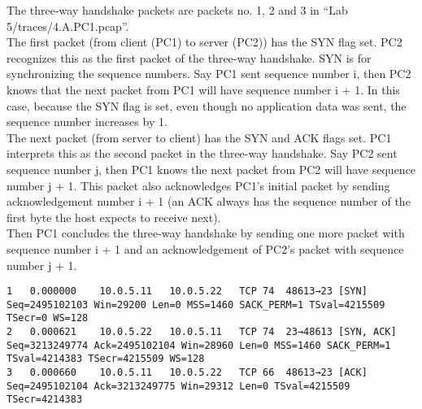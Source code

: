 The three-way handshake packets are packets no. 1, 2 and 3 in ``Lab 5/traces/4.A.PC1.pcap''. \\
The first packet (from client (PC1) to server (PC2)) has the SYN flag set. PC2 recognizes this as the first packet of the three-way handshake. SYN is for synchronizing the sequence numbers. Say PC1 sent sequence number i, then PC2 knows that the next packet from PC1 will have sequence number i + 1. In this case, because the SYN flag is set, even though no application data was sent, the sequence number increases by 1. \\
The next packet (from server to client) has the SYN and ACK flags set. PC1 interprets this as the second packet in the three-way handshake. Say PC2 sent sequence number j, then PC1 knows the next packet from PC2 will have sequence number j + 1. This packet also acknowledges PC1's initial packet by sending acknowledgement number i + 1 (an ACK always has the sequence number of the first byte the host expects to receive next). \\
Then PC1 concludes the three-way handshake by sending one more packet with sequence number i + 1 and an acknowledgement of PC2's packet with sequence number j + 1.

\begin{lstlisting}
1	0.000000	10.0.5.11	10.0.5.22	TCP	74	48613→23 [SYN] Seq=2495102103 Win=29200 Len=0 MSS=1460 SACK_PERM=1 TSval=4215509 TSecr=0 WS=128
2	0.000621	10.0.5.22	10.0.5.11	TCP	74	23→48613 [SYN, ACK] Seq=3213249774 Ack=2495102104 Win=28960 Len=0 MSS=1460 SACK_PERM=1 TSval=4214383 TSecr=4215509 WS=128
3	0.000660	10.0.5.11	10.0.5.22	TCP	66	48613→23 [ACK] Seq=2495102104 Ack=3213249775 Win=29312 Len=0 TSval=4215509 TSecr=4214383
\end{lstlisting}
